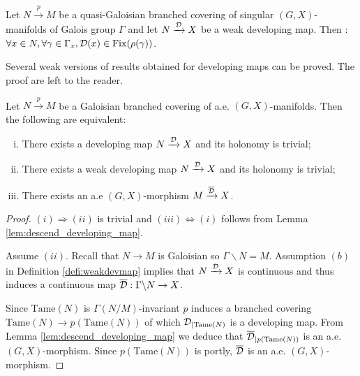 \begin{rem}\label{rem:quasi_galoisian_branched_covering_singular}
 Let $N\xrightarrow{p}M$ be a quasi-Galoisian branched covering of singular $(G,X)$-manifolds of Galois group $\Gamma$ and let $N\xrightarrow{\mathcal{D}} X$ be a weak developing map. Then : 
$\forall x\in N, \forall \gamma \in \Gamma_x, \mathcal{D}(x) \in \mathrm{Fix}(\rho(\gamma))$.
\end{rem}




Several weak versions of results obtained for developing maps can be proved. The proof are left to the reader. 
\begin{lem}\label{lem:galoisian_branched_covering_manifolds}
 Let $N\xrightarrow{p}M$ be a Galoisian branched covering of a.e. $(G,X)$-manifolds. Then the following are equivalent:
 \begin{enumerate}[(i)]
  \item There exists a developing map $N\xrightarrow{\mathcal{D}}X$ and its holonomy is trivial;
  \item There exists a weak developing map $N\xrightarrow{\mathcal{D}}X$ and its holonomy is trivial;
  \item There exists an a.e $(G,X)$-morphism $M\xrightarrow{\overline {\mathcal{D}}}X$.
 \end{enumerate}
\end{lem}
\begin{proof}
$(i)\Rightarrow (ii)$ is trivial and $(iii)\Leftrightarrow (i)$ follows from Lemma \ref{lem:descend_developing_map}.

Assume $(ii)$. Recall that $N\rightarrow M$ is Galoisian so $\Gamma \backslash N=M$. Assumption $(b)$ in Definition \ref{defi:weakdevmap} implies that $N\xrightarrow{\mathcal{D}} X$ is continuous and thus induces a continuous map $\overline {\mathcal{D}} : \Gamma \backslash N \rightarrow   X$.


 Since $\mathrm{Tame}(N)$ is $\Gamma(N/M)$-invariant $p$ induces a branched covering $\mathrm{Tame}(N)\rightarrow p(\mathrm{Tame}(N))$ of which $\mathcal{D}_{|\mathrm{Tame}(N)}$ is a developing map.  From Lemma \ref{lem:descend_developing_map} we deduce that $\overline {\mathcal{D}}_{|p(\mathrm{Tame}(N))}$ is an a.e. $(G,X)$-morphism. Since $p(\mathrm{Tame}(N))$ is portly, $\overline {\mathcal{D}}$ is an a.e. $(G,X)$-morphism.
\end{proof}

